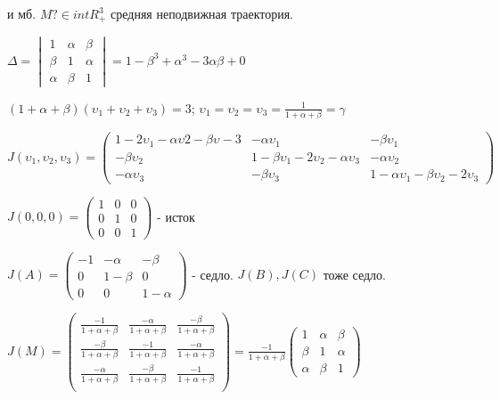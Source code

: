 \vspace{0.5cm}
и мб. \(M ? \in intR_+^3\) средняя неподвижная траектория.

\vspace{0.5cm}
\(
	\Delta = 
	\begin{vmatrix}
	1 & \alpha & \beta \\ 
	\beta & 1 & \alpha \\
	\alpha & \beta & 1
	\end{vmatrix}
	= 1 - \beta^3 + \alpha^3 - 3\alpha\beta + 0
\)

\vspace{0.5cm}
\((1 + \alpha + \beta)(\upsilon_1 + \upsilon_2 + \upsilon_3) = 3 \);\hspace{0.5cm}
\(\upsilon_1 = \upsilon_2 = \upsilon_3 = \frac{1}{1 + \alpha + \beta} = \gamma \)

\vspace{0.5cm}
\(
J (\upsilon_1,\upsilon_2,\upsilon_3) = 
	\begin{pmatrix}
		1 - 2\upsilon_1 - \alpha\upsilon2 - \beta\upsilon-3 & -\alpha\upsilon_1 & -\beta\upsilon_1 \\
		-\beta\upsilon_2 & 1 - \beta\upsilon_1 - 2\upsilon_2 - \alpha\upsilon_3 & -\alpha\upsilon_2\\
		-\alpha\upsilon_3 & -\beta\upsilon_3 & 1 - \alpha\upsilon_1 - \beta\upsilon_2 - 2\upsilon_3
	\end{pmatrix}
\)

\vspace{0.5cm}
\(
J(0,0,0) = 
	\begin{pmatrix}
		1 & 0 & 0\\
		0 & 1 & 0\\
		0 & 0 & 1
	\end{pmatrix}
\)
\hspace{0.2cm} - исток

\vspace{0.5cm}
\(
J(A) = 
	\begin{pmatrix}
	-1 & -\alpha & -\beta \\
	0  & 1-\beta & 0      \\
	0  &   0     & 1-\alpha
	\end{pmatrix}
\)
\hspace{0.2cm} - седло. \(J(B), J(C)\) тоже седло.

\vspace{0.5cm}
\begin{LARGE}
\(
J(M) =
	\begin{pmatrix}
		\frac{-1}{1+\alpha + \beta} & \frac{-\alpha}{1+\alpha+\beta} & \frac{-\beta}{1+\alpha+\beta}\\
		 \frac{-\beta}{1+\alpha+\beta} & \frac{-1}{1+\alpha + \beta} & \frac{-\alpha}{1+\alpha+\beta}\\
		 \frac{-\alpha}{1+\alpha+\beta} & \frac{-\beta}{1+\alpha+\beta} & \frac{-1}{1+\alpha + \beta}\\
	\end{pmatrix}
=\frac{-1}{1+\alpha+\beta}
	\begin{pmatrix}
		1 & \alpha & \beta\\
		\beta & 1 & \alpha\\
		\alpha & \beta & 1
	\end{pmatrix}
\)
\end{LARGE}


